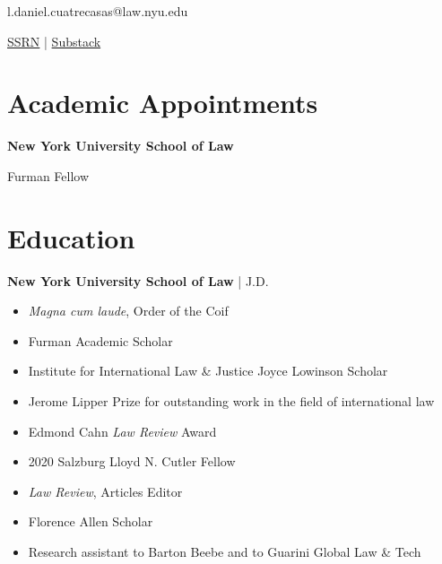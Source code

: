 \documentclass[10pt]{article}
\newenvironment{unclutter}{\begin{spacing}{1.3}}{\end{spacing}}
\newcommand{\years}[1]{\marginnote{\scriptsize #1}}
\begin{document}
 \thispagestyle{firstpage}

 \hfill l.daniel.cuatrecasas@law.nyu.edu \par
\vspace{1pt}
\null \hfill \href{https://papers.ssrn.com/sol3/cf_dev/AbsByAuth.cfm?per_id=3987330}{SSRN} | \href{https://nycdna.substack.com/}{Substack}

\bigskip

\section*{Academic Appointments}

\years{2024—}
\begin{unclutter}
\textbf{New York University School of Law} \end{unclutter} \par
Furman Fellow


\section*{Education}

\years{2021}
\textbf{New York University School of Law} | J.D.
\smallskip
\begin{itemize}[itemsep = 0.25pt]
\item \textit{Magna cum laude}, Order of the Coif
\item Furman Academic Scholar
\item Institute for International Law \& Justice Joyce Lowinson Scholar
\item Jerome Lipper Prize for outstanding work in the field of international law
\item Edmond Cahn \textit{Law Review} Award
\item 2020 Salzburg Lloyd N. Cutler Fellow
\item \textit{Law Review}, Articles Editor
\item Florence Allen Scholar
\item Research assistant to Barton Beebe and to Guarini Global Law \& Tech
\end{itemize}
\bigskip
\end{document}
